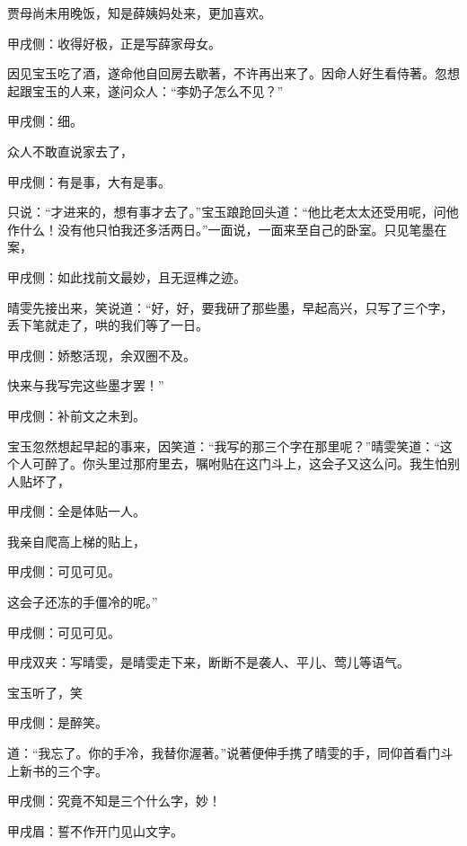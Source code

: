 \begin{parag}
    贾母尚未用晚饭，知是薛姨妈处来，更加喜欢。\begin{note}甲戌侧：收得好极，正是写薛家母女。\end{note}因见宝玉吃了酒，遂命他自回房去歇著，不许再出来了。因命人好生看侍著。忽想起跟宝玉的人来，遂问众人：“李奶子怎么不见？”\begin{note}甲戌侧：细。\end{note}众人不敢直说家去了，\begin{note}甲戌侧：有是事，大有是事。\end{note}只说：“才进来的，想有事才去了。”宝玉踉跄回头道：“他比老太太还受用呢，问他作什么！没有他只怕我还多活两日。”一面说，一面来至自己的卧室。只见笔墨在案，\begin{note}甲戌侧：如此找前文最妙，且无逗榫之迹。\end{note}晴雯先接出来，笑说道：“好，好，要我研了那些墨，早起高兴，只写了三个字，丢下笔就走了，哄的我们等了一日。\begin{note}甲戌侧：娇憨活现，余双圈不及。\end{note}快来与我写完这些墨才罢！”\begin{note}甲戌侧：补前文之未到。\end{note}宝玉忽然想起早起的事来，因笑道：“我写的那三个字在那里呢？”晴雯笑道：“这个人可醉了。你头里过那府里去，嘱咐贴在这门斗上，这会子又这么问。我生怕别人贴坏了，\begin{note}甲戌侧：全是体贴一人。\end{note}我亲自爬高上梯的贴上，\begin{note}甲戌侧：可见可见。\end{note}这会子还冻的手僵冷的呢。”\begin{note}甲戌侧：可见可见。\end{note}\begin{note}甲戌双夹：写晴雯，是晴雯走下来，断断不是袭人、平儿、莺儿等语气。\end{note}宝玉听了，笑\begin{note}甲戌侧：是醉笑。\end{note}道：“我忘了。你的手冷，我替你渥著。”说著便伸手携了晴雯的手，同仰首看门斗上新书的三个字。\begin{note}甲戌侧：究竟不知是三个什么字，妙！\end{note}\begin{note}甲戌眉：誓不作开门见山文字。\end{note}
\end{parag}


